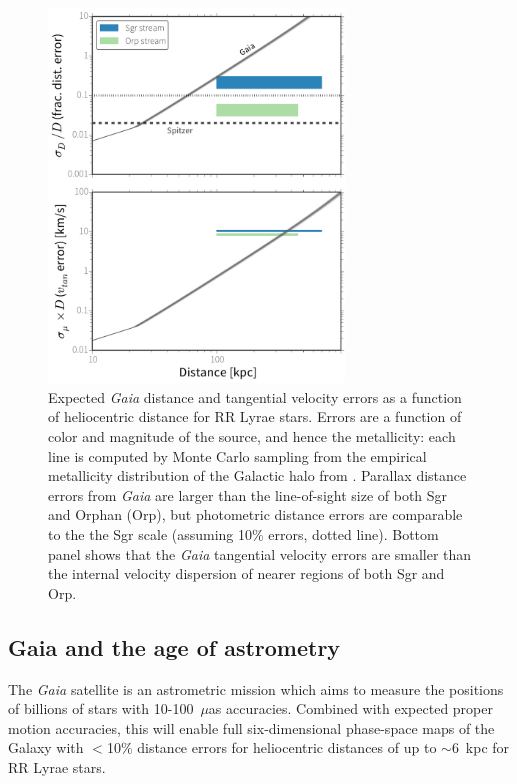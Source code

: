 \begin{figure}[hp!]
\begin{center}
\includegraphics[width=0.7\textwidth]{figures/ch1/fig1.pdf}

\caption{Expected {\it Gaia} distance and tangential velocity errors as a function of heliocentric distance for RR Lyrae stars. Errors are a function of color and magnitude of the source, and hence the metallicity: each line is computed
by Monte Carlo sampling from the empirical metallicity distribution of
the Galactic halo from \cite{ivezic08}. Parallax distance errors from {\it Gaia} are larger than the line-of-sight size of both Sgr and Orphan (Orp), but photometric distance errors are comparable to the the Sgr scale (assuming 10\% errors, dotted line). Bottom panel shows that the {\it Gaia} tangential velocity errors are smaller than the internal velocity dispersion of nearer regions of both Sgr and Orp. }\label{fig:gaia_errors}
\end{center}
\end{figure}

\subsection{Gaia and the age of astrometry}
\label{sec:gaia}
The {\it Gaia} satellite \citep{gaia01} is
an astrometric mission which aims to measure the positions of billions
of stars with 10-100~$\mu$as accuracies. Combined with expected 
proper motion accuracies, this will enable full six-dimensional phase-space 
maps of the Galaxy with $<$10\% distance errors for heliocentric distances of
up to $\sim$6~kpc for RR Lyrae stars.

